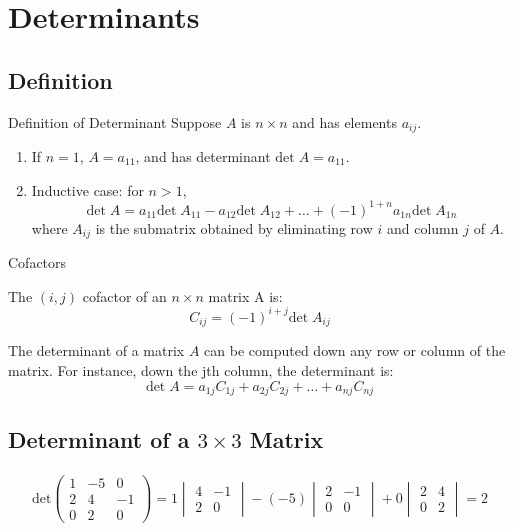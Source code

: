 \section{Determinants}
\subsection{Definition}
\begin{definition}
    Definition of Determinant
    Suppose \(A\) is \(n \times n\) and has elements \(a_{ij}\).
\begin{enumerate}
    \item If \(n=1\), \(A=a_{11}\), and has determinant \(\text{det} \; A = a_{11}\).
    \item Inductive case: for \(n > 1\),
    \[\text{det} \; A = a_{11} \text{det} \; A_{11} - a_{12} \text{det} \; A_{12} + \dots + (-1)^{1+n} a_{1n} \text{det} \; A_{1n}\]
    where \(A_{ij}\) is the submatrix obtained by eliminating row \(i\) and column \(j\) of \(A\).
\end{enumerate}
\end{definition}

\begin{definition}
    Cofactors

    The \((i, j)\) cofactor of an \(n\times n\) matrix A is:
    \[C_{ij} = (-1)^{i+j} \text{det} \; A_{ij}\]
\end{definition}

\begin{theorem}
    The determinant of a matrix \(A\) can be computed down any row or column of the matrix. For instance, down the jth column, the determinant is:
    \[\text{det} \; A = a_{1j} C_{1j} + a_{2j} C_{2j} + \dots + a_{nj} C_{nj}\]
\end{theorem}

\subsection{Determinant of a \(3 \times 3\) Matrix}
\begin{align}
    \text{det} \begin{pmatrix}
        1 & -5 & 0 \\
        2 & 4 & -1 \\
        0 & 2 & 0
    \end{pmatrix} = 1 \begin{vmatrix}
        4 & -1 \\ 2 & 0
    \end{vmatrix} - (-5) \begin{vmatrix}
        2 & -1 \\ 0 & 0
    \end{vmatrix} + 0 \begin{vmatrix}
        2 & 4 \\ 0 & 2
    \end{vmatrix} = 2
\end{align}

